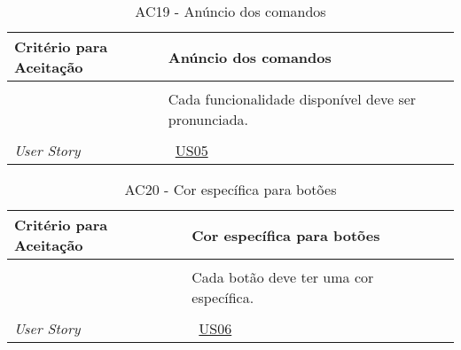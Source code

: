 \begin{apendicesenv}
\begin{table}[ht]
\begin{center}
\begin{tabularx}{\textwidth}{|lX|l|}
\end{tabularx}
\end{center}
\label{tab:us01a18}
\end{table}


\begin{table}[ht]
\centering
\caption{AC19 - Anúncio dos comandos}
\vspace{0.1cm}
\begin{center}
\begin{tabularx}{\textwidth}{|lX|l|}

\hline
\textbf{Critério para Aceitação} & Anúncio dos comandos \\
\hline
 & \\
 & Cada funcionalidade disponível deve ser pronunciada. \\
 & \\
\hline
\textit{User Story} & ~\hyperref[tab:us05]{US05} \\
\hline

\end{tabularx}
\end{center}
\label{tab:us01a19}
\end{table}


\begin{table}[ht]
\centering
\caption{AC20 - Cor específica para botões}
\vspace{0.1cm}
\begin{center}
\begin{tabularx}{\textwidth}{|lX|l|}

\hline
\textbf{Critério para Aceitação} & Cor específica para botões \\
\hline
 & \\
 & Cada botão deve ter uma cor específica. \\
 & \\
\hline
\textit{User Story} & ~\hyperref[tab:us06]{US06} \\
\hline

\end{tabularx}
\end{center}
\label{tab:us01a20}
\end{table}


\end{apendicesenv}
